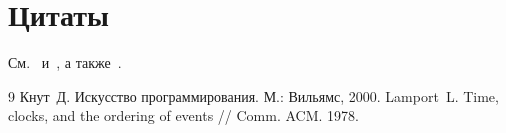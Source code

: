 \documentclass[12pt]{article}
\begin{document}
\section{Цитаты}

См.~\cite{knuth} и~\cite{knuth,lamport}, а также~\cite[гл.~2]{lamport}.

\begin{thebibliography}{9}
 Кнут~Д. Искусство программирования. М.: Вильямс, 2000.
 Lamport~L. Time, clocks, and the ordering of events // Comm. ACM. 1978.
\end{thebibliography}
\end{document}
